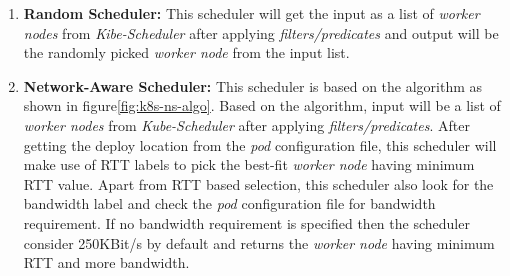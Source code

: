 \begin{enumerate}
  \item \textbf{Random Scheduler:} This scheduler will get the input as a list of \emph{worker nodes} from \emph{Kibe-Scheduler} after applying \emph{filters/predicates} and output will be the randomly picked \emph{worker node} from the input list\cite{Santos2019}.
  \item \textbf{Network-Aware Scheduler:} This scheduler is based on the algorithm as shown in figure\ref{fig:k8s-ns-algo}. Based on the algorithm, input will be a list of \emph{worker nodes} from \emph{Kube-Scheduler} after applying \emph{filters/predicates}. After getting the deploy location from the \emph{pod} configuration file, this scheduler will make use of RTT labels to pick the best-fit \emph{worker node} having minimum RTT value\cite{Santos2019}. Apart from RTT based selection, this scheduler also look for the bandwidth label and check the \emph{pod} configuration file for bandwidth requirement\cite{Santos2019}. If no bandwidth requirement is specified then the scheduler consider 250KBit/s by default and returns the \emph{worker node} having minimum RTT and more bandwidth\cite{Santos2019}.
\end{enumerate}
